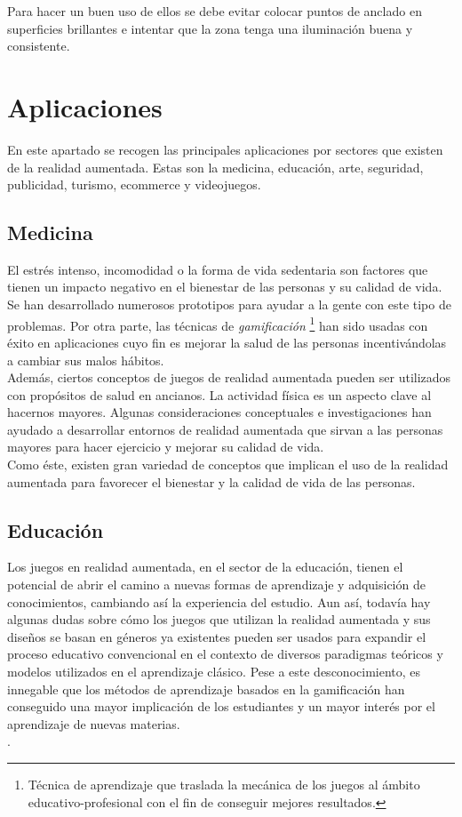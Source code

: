 Para hacer un buen uso de ellos se debe evitar colocar puntos de anclado en superficies brillantes e intentar que la zona tenga una iluminación buena y consistente.

\section{Aplicaciones}
En este apartado se recogen las principales aplicaciones por sectores que existen de la realidad aumentada. Estas son la medicina, educación, arte, seguridad, publicidad, turismo, ecommerce y videojuegos.
\subsection{Medicina}
El estrés intenso, incomodidad o la forma de vida sedentaria son factores que tienen un impacto negativo en el bienestar de las personas y su calidad de vida. Se han desarrollado numerosos prototipos para ayudar a la gente con este tipo de problemas. Por otra parte, las técnicas de \textit{gamificación} \footnote{ Técnica de aprendizaje que traslada la mecánica de los juegos al ámbito educativo-profesional con el fin de conseguir mejores resultados.} han sido usadas con éxito en aplicaciones cuyo fin es mejorar la salud de las personas incentivándolas a cambiar sus malos hábitos.\\
Además, ciertos conceptos de juegos de realidad aumentada pueden ser utilizados con propósitos de salud en ancianos. La actividad física es un aspecto clave al hacernos mayores. Algunas consideraciones conceptuales e investigaciones han ayudado a desarrollar entornos de realidad aumentada que sirvan a las personas mayores para hacer ejercicio y mejorar su calidad de vida.\\
Como éste, existen gran variedad de conceptos que implican el uso de la realidad aumentada para favorecer el bienestar y la calidad de vida de las personas.\\

\cite{ARGames_Gamification}
\subsection{Educación}
Los juegos en realidad aumentada, en el sector de la educación, tienen el potencial de abrir el camino a nuevas formas de aprendizaje y adquisición de conocimientos, cambiando así la experiencia del estudio. Aun así, todavía hay algunas dudas sobre cómo los juegos que utilizan la realidad aumentada y sus diseños se basan en géneros ya existentes pueden ser usados para expandir el proceso educativo convencional en el contexto de diversos paradigmas teóricos y modelos utilizados en el aprendizaje clásico. Pese a este desconocimiento, es innegable que los métodos de aprendizaje basados en la gamificación han conseguido una mayor implicación de los estudiantes y un mayor interés por el aprendizaje de nuevas materias.\\
 \cite{ARGames_Gamification}.\\

